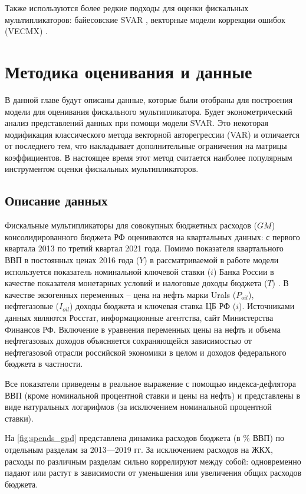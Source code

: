 \documentclass[12pt, a4paper]{extarticle}
\begin{document}
\par
    Также используются более редкие подходы для оценки фискальных мультипликаторов: байесовские SVAR \cite{cb}, векторные модели коррекции ошибок  (VECMX) \cite{belarus}.



\newpage
\section{Методика оценивания и данные}

В данной главе будут описаны данные, которые были отобраны для построения модели для оценивания фискального мультипликатора. Будет эконометрический  анализ представлений данных при помощи модели SVAR. Это некоторая модификация классического метода векторной авторегрессии (VAR) и отличается от последнего тем, что накладывает дополнительные ограничения на матрицы коэффициентов. В настоящее время этот метод считается наиболее популярным инструментом оценки фискальных мультипликаторов.

\subsection{Описание данных}
\par
    Фискальные мультипликаторы для совокупных бюджетных расходов ($GM$) консолидированного бюджета РФ оцениваются на квартальных данных: с первого квартала 2013 по третий квартал 2021 года. Помимо показателя квартального ВВП в постоянных ценах 2016 года ($Y$) в рассматриваемой в работе модели используется показатель номинальной ключевой ставки ($i$) Банка России в качестве показателя монетарных условий и налоговые доходы бюджета ($T$) . В качестве экзогенных переменных -- цена на нефть марки Urals ($P_{oil}$), нефтегазовые ($I_{oil}$) доходы бюджета и ключевая ставка ЦБ РФ ($i$). Источниками данных являются  Росстат, информационные агентства, сайт Министерства Финансов РФ.
    Включение в уравнения переменных цены на нефть и объема нефтегазовых доходов объясняется сохраняющейся зависимостью от нефтегазовой отрасли российской экономики в целом и доходов федерального бюджета в частности.

\par
    Все показатели приведены в реальное выражение с помощью индекса-дефлятора ВВП (кроме номинальной процентной ставки и цены на нефть) и представлены в виде натуральных логарифмов (за исключением номинальной процентной ставки).

\par
    На \figurename{\ref{fig:spends_gpd}} представлена динамика расходов бюджета (в \% ВВП) по отдельным разделам за 2013—2019 гг. За исключением расходов на ЖКХ, расходы по различным разделам сильно коррелируют между собой: одновременно падают или растут в зависимости от уменьшения или увеличения общих расходов бюджета.
    
\end{document}

